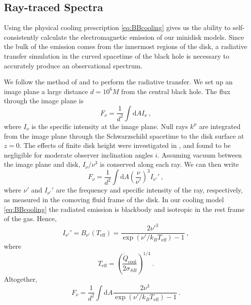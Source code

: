 \documentclass{emulateapj}
\newcommand{\sig}{\sigma}
\newcommand{\dd}{\mbox{d}}
\begin{document}
\subsection{Ray-traced Spectra}
\label{subsec:raySpec}

Using the physical cooling prescription \eqref{eq:BBcooling} gives us the ability to self-consistently calculate the electromagnetic emission of our minidisk models.  Since the bulk of the emission comes from the innermost regions of the disk, a radiative transfer simulation in the curved spacetime of the black hole is necessary to accurately produce an observational spectrum.

We follow the method of \cite{Kulkarni11} and \cite{Zhu12} to perform the radiative transfer.  We set up an image plane a large distance $d = 10^6 M$ from the central black hole.  The flux through the image plane is
\begin{equation}
	F_\nu = \frac{1}{d^2} \int \dd A I_\nu \ ,
\end{equation}
where $I_\nu$ is the specific intensity at the image plane.  Null rays $k^\mu$ are integrated from the image plane through the Schwarzschild spacetime to the disk surface at $z=0$.  The effects of finite disk height were investigated in \cite{Kulkarni11}, and found to be negligible for moderate observer inclination angles $i$. Assuming vacuum between the image plane and disk, $I_\nu / \nu^3$ is conserved along each ray.  We can then write
\begin{equation}
	F_\nu = \frac{1}{d^2} \int \dd A \left( \frac{\nu}{\nu'} \right)^3 I_{\nu'}' \ ,
\end{equation}
where $\nu'$ and $I_{\nu'}'$ are the frequency and specific intensity of the ray, respectively, as measured in the comoving fluid frame of the disk. In our cooling model \eqref{eq:BBcooling} the radiated emission is blackbody and isotropic in the rest frame of the gas.  Hence,
\begin{equation}
	I_{\nu'}' = B_{\nu '} (T_\text{eff}) = \frac{2 {\nu'}^3}{\exp\left(\nu' / k_B T_\text{eff}\right) - 1}\ ,
\end{equation}
where
\begin{equation}
	T_\text{eff} = \left(\frac{\dot{Q}_\text{cool}}{2 \sig_{SB}} \right)^{1/4} \ .
\end{equation}
Altogether,
\begin{equation}
	F_{\nu} = \frac{1}{d^2} \int \dd A \frac{2 \nu^3}{\exp\left(\nu' / k_B T_\text{eff}\right) - 1} \ .
\end{equation}
\end{document}
